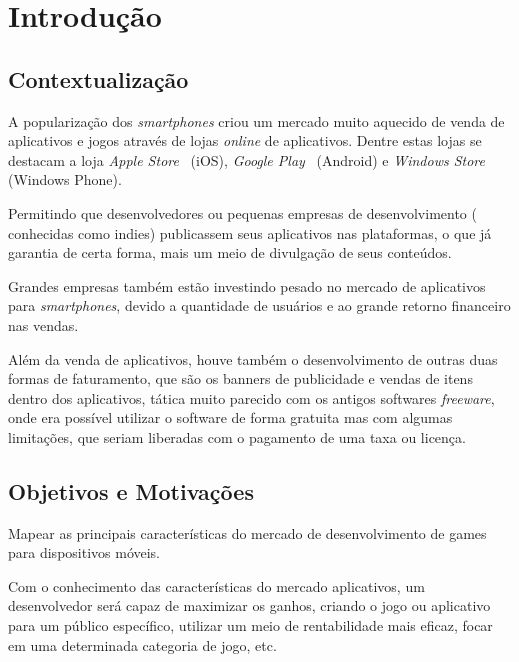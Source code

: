 
\chapter{Introdução}
\label{cap:introducao}


\section{Contextualização}

A popularização dos \emph{smartphones} criou um mercado muito aquecido de venda de aplicativos e jogos através de lojas \emph{online} de aplicativos. Dentre estas lojas se destacam a loja \emph{Apple Store}~\cite{appstore} (iOS), \emph{Google Play}~\cite{googleplay} (Android) e \emph{Windows Store} (Windows Phone).


Permitindo que desenvolvedores ou pequenas empresas de desenvolvimento ( conhecidas como indies) publicassem seus aplicativos nas plataformas, o que já garantia de certa forma, mais um meio de divulgação de seus conteúdos.


Grandes empresas também estão investindo pesado no mercado de aplicativos para \emph{smartphones}, devido a quantidade de usuários e ao grande retorno financeiro nas vendas.



Além da venda de aplicativos, houve também o desenvolvimento de outras duas formas de faturamento, que são os banners de publicidade e vendas de itens dentro dos aplicativos, tática muito parecido com os antigos softwares \emph{freeware}, onde era possível utilizar o software de forma gratuita mas com algumas limitações, que seriam liberadas com o pagamento de uma taxa ou licença.







\section{Objetivos e Motivações}


Mapear as principais características do mercado de desenvolvimento de games para dispositivos móveis. 

Com o conhecimento das características do mercado aplicativos, um desenvolvedor será capaz de maximizar os ganhos, criando o jogo ou aplicativo para um público específico, utilizar um meio de rentabilidade mais eficaz, focar em uma determinada categoria de jogo, etc.
 

